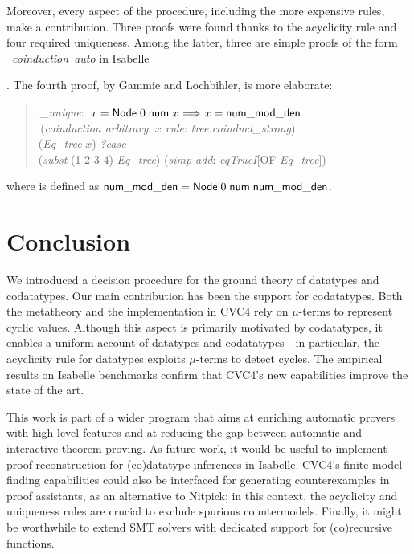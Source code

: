 Moreover, every aspect of the procedure, including the
more expensive rules, make a contribution.
%
Three proofs were found thanks to
the acyclicity rule and four required uniqueness. Among the latter,
three are simple proofs of the form
~\textit{coinduction}~\textit{auto}
in Isabelle\begin{rep} \cite{blanchette-et-al-2014-impl}\end{rep}.
The fourth proof, by Gammie and Lochbihler, is more elaborate:
%
\begin{quote}
 \,\textit{\nummodden\_unique}: \,$x = \const{Node}\;0\;\const{num}\; x \vthinspace\Longrightarrow\vthinspace x = \const{\nummodden}$ \\
 \,(\textit{coinduction arbitrary}: $x$ \textit{rule}: \textit{tree.coinduct\_strong}) \\
\noindent\hbox{}\quad  {} (\textit{Eq\_tree} $x$)  \textit{?case} \\
\noindent\hbox{}\qquad  {} (\textit{subst} (1 2 3 4) \textit{Eq\_tree}) (\textit{simp add}: \textit{eqTrueI}[OF \textit{Eq\_tree}]) \\
\end{quote}
%
\noindent
where \const{\nummodden} is defined as $\textsf{num\hbox{\rm\_}mod\hbox{\rm\_}den} =
\textsf{Node}\;0\;\textsf{num}\;\textsf{num\hbox{\rm\_}mod\hbox{\rm\_}den}$.

\section{Conclusion}
\label{sec:conclusion}

We introduced a decision procedure for the ground theory of datatypes and
codatatypes. Our main
contribution has been the support for codatatypes. Both the metatheory and
the implementation in CVC4 rely on $\mu$-terms to represent cyclic values.
Although this aspect is primarily motivated by codatatypes, it enables
a uniform account of datatypes and codatatypes---in particular,
the acyclicity rule for datatypes exploits $\mu$-terms to detect cycles.
The empirical results on Isabelle benchmarks
confirm that CVC4's new capabilities improve the state of the art.

This work is part of a wider program that aims at enriching automatic provers
with high-level features and at reducing the gap between automatic and
interactive theorem proving. As future work, it would be useful to implement
proof reconstruction for (co)data\-type inferences in Isabelle.
CVC4's finite model finding capabilities \cite{reynolds-et-al-2013} could also
be interfaced for generating counterexamples in proof assistants,
as an alternative to Nitpick;
in this context, the acyclicity and uniqueness rules are
crucial to exclude spurious countermodels. Finally, it might be worthwhile to
extend SMT solvers with dedicated support for (co)recursive functions.

